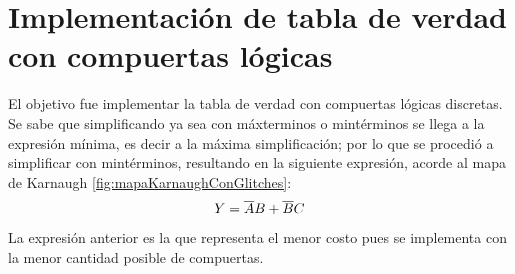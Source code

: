 \section{Implementación de tabla de verdad con compuertas lógicas}

\vspace{2mm}
\begin{table}
    \begin{center}
        \begin{Karnaughvuit}
        \end{Karnaughvuit}
        \caption{Mapa de Karnaugh de menor costo.}
        \label{fig:mapaKarnaughConGlitches}
    \end{center}
\end{table} 
\par
El objetivo fue implementar la tabla de verdad con compuertas lógicas discretas. 
Se sabe que simplificando ya sea con máxterminos o mintérminos se llega a la expresión mínima, es decir a la máxima simplificación; 
por lo que se procedió a simplificar con mintérminos, resultando en la siguiente expresión, acorde al mapa de Karnaugh \ref{fig:mapaKarnaughConGlitches}:
\vspace{4mm}
\begin{equation}
    Y=\overline{A}B+\overline{B}C
    \vspace{5mm}
\end{equation}
La expresión anterior es la que representa el menor costo pues se implementa con la menor cantidad posible de compuertas.
